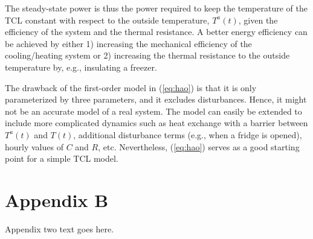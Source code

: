 {The steady-state power is thus the power required to keep the temperature of the TCL constant with respect to the outside temperature, $T^{a}(t)$, given the efficiency of the system and the thermal resistance. A better energy efficiency can be achieved by either 1) increasing the mechanical efficiency of the cooling/heating system or 2) increasing the thermal resistance to the outside temperature by, e.g., insulating a freezer.

The drawback of the first-order model in (\ref{eq:hao}) is that it is only parameterized by three parameters, and it excludes disturbances. Hence, it might not be an accurate model of a real system. The model can easily be extended to include more complicated dynamics such as heat exchange with a barrier between $T^{a}(t)$ and $T(t)$, additional disturbance terms (e.g., when a fridge is opened), hourly values of $C$ and $R$, etc. Nevertheless, (\ref{eq:hao}) serves as a good starting point for a simple TCL model.

\section*{Appendix B}\label{appendix:B}
Appendix two text goes here.}
